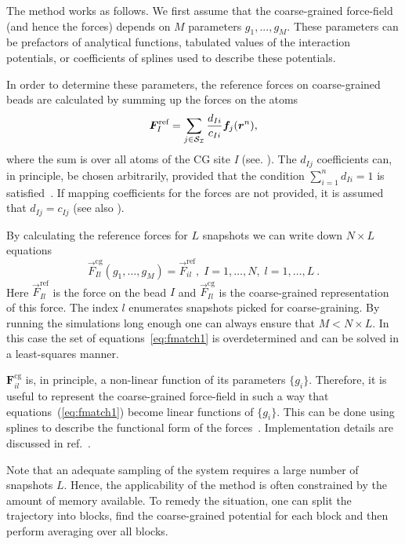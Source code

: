 The method works as follows. We first assume that the coarse-grained force-field (and hence the forces) depends on $M$ parameters $g_1,...,g_M $. These parameters can be prefactors of analytical functions, tabulated values of the interaction potentials, or coefficients of splines used to describe these potentials.

In order to determine these parameters, the reference forces on coarse-grained beads are calculated by summing up the forces on the atoms
\begin{equation}
  {\vec F}_I^\text{ref} = \sum_{j \in {\cal S_I}} \frac{d_{Ii}}{c_{Ii}} {\vec f}_j({\vec r^n}),
  \label{eq:force_mapping}
\end{equation}
where the sum is over all atoms of the CG site {\it I} (see. ).
The $d_{Ij}$ coefficients can, in principle, be chosen arbitrarily, provided that the condition $ \sum_{i=1}^{n}d_{Ii}=1$ is satisfied~\cite{Noid:2008.1}. If mapping coefficients for the forces are not provided, it is assumed that $d_{Ij} = c_{Ij}$ (see also ).

By calculating the reference forces for $L$ snapshots we can write down $N \times L$ equations
%
\begin{equation}
  {\vec F}_{Il}^\text{cg}(g_1, \dots ,g_M)=\vec F_{il}^\text{ref},\;
  I=1,\dots,N,\; l=1,\dots,L~.
  \label{eq:fmatch1}
\end{equation}
%
Here ${\vec F}_{Il}^\text{ref}$ is the force on the bead $I$ and ${\vec F}_{Il}^\text{cg} $ is the coarse-grained representation of this force. The index $l$ enumerates snapshots picked for coarse-graining. By running the simulations long enough one can always ensure that $M < N \times L$. In this case the set of equations~\ref{eq:fmatch1} is overdetermined and can be solved in a least-squares manner.

${\bm F}_{il}^\text{cg}$ is, in principle, a non-linear function of its parameters $\{g_i\}$. Therefore, it is useful to represent the coarse-grained force-field in such a way that equations~(\ref{eq:fmatch1}) become linear functions of $\{g_i\}$. This can be done using splines to describe the functional form of the forces~\cite{Izvekov:2005}. Implementation details are discussed in ref.~\cite{Ruehle:2009.a}.

Note that an adequate sampling of the system requires a large number of snapshots $L$. Hence, the applicability of the method is often constrained by the amount of memory available. To remedy the situation, one can split the trajectory into blocks, find the coarse-grained potential for each block and then perform averaging over all blocks.

